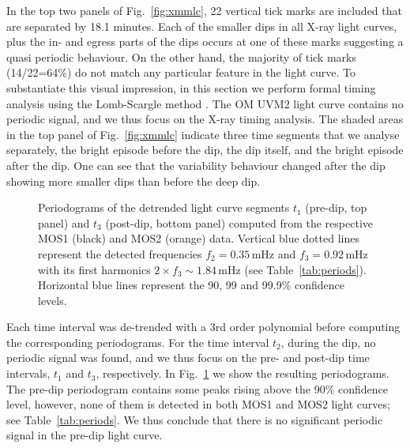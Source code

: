 \documentclass{aa}
\begin{document}
In the top two panels of Fig.~\ref{fig:xmmlc}, 22 vertical tick marks are included
that are separated by 18.1 minutes. Each of the smaller dips in all X-ray light
curves, plus the in- and egress parts of the dips occurs at one of these marks suggesting
a quasi periodic behaviour. On the other hand, the majority of tick marks (14/22=64\%) do not
match any particular feature in the light curve.
To substantiate this visual impression, in this section we perform formal timing
analysis using the Lomb-Scargle method \citep{scargle1982}. The OM UVM2 light
curve contains no periodic signal, and we thus focus on the X-ray timing
analysis. The shaded areas in the top panel of Fig.~\ref{fig:xmmlc} indicate
three time segments that we analyse separately, the bright episode before the
dip, the dip itself, and the bright episode after the dip. One can see that
the variability behaviour changed after the dip showing more smaller dips than
before the deep dip.\\

\begin{figure}
\caption{Periodograms of the detrended light curve segments $t_1$ (pre-dip, top panel)
and $t_3$ (post-dip, bottom panel) computed from the respective MOS1 (black)
and MOS2 (orange) data. Vertical blue dotted lines represent the detected
frequencies $f_2=0.35$\,mHz and $f_3 = 0.92$\,mHz with its first harmonics
$2\times f_3\sim1.84$\,mHz (see Table~\ref{tab:periods}).
Horizontal blue lines represent the 90, 99 and 99.9\% confidence levels.}
\label{pds_3}
\end{figure}

Each time interval was
de-trended with a 3rd order polynomial before computing the corresponding
periodograms. For the time interval $t_2$, during the dip, no periodic
signal was found, and we thus focus on the pre- and post-dip time intervals,
$t_1$ and $t_3$, respectively. In Fig.~\ref{pds_3}
we show the resulting periodograms. The pre-dip periodogram contains
some peaks rising above the 90\% confidence level, however, none of them is
detected in both MOS1 and MOS2 light curves; see Table~\ref{tab:periods}.
We thus conclude that there is no significant periodic signal in the pre-dip
light curve.\\
\end{document}
